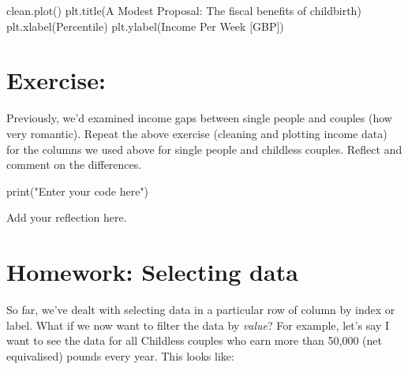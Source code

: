 \documentclass[
  letterpaper,
  DIV=11,
  numbers=noendperiod]{scrreprt}
\newenvironment{Shaded}{\begin{snugshade}}{\end{snugshade}}
\newcommand{\BuiltInTok}[1]{\textcolor[rgb]{0.00,0.23,0.31}{#1}}
\newcommand{\NormalTok}[1]{\textcolor[rgb]{0.00,0.23,0.31}{#1}}
\newcommand{\StringTok}[1]{\textcolor[rgb]{0.13,0.47,0.30}{#1}}
\begin{document}
\begin{Shaded}
\begin{Highlighting}[]
\NormalTok{clean.plot()}
\NormalTok{plt.title(}\StringTok{\textquotesingle{}A Modest Proposal: The fiscal benefits of childbirth\textquotesingle{}}\NormalTok{)}
\NormalTok{plt.xlabel(}\StringTok{\textquotesingle{}Percentile\textquotesingle{}}\NormalTok{)}
\NormalTok{plt.ylabel(}\StringTok{\textquotesingle{}Income Per Week [GBP]\textquotesingle{}}\NormalTok{)}
\end{Highlighting}
\end{Shaded}

\hypertarget{exercise-1}{%
\section{Exercise:}\label{exercise-1}}

Previously, we'd examined income gaps between single people and couples
(how very romantic). Repeat the above exercise (cleaning and plotting
income data) for the columns we used above for single people and
childless couples. Reflect and comment on the differences.

\begin{Shaded}
\begin{Highlighting}[]
\BuiltInTok{print}\NormalTok{(}\StringTok{"Enter your code here"}\NormalTok{)}
\end{Highlighting}
\end{Shaded}

\begin{Shaded}
\begin{Highlighting}[]
\NormalTok{Add your reflection here.}
\end{Highlighting}
\end{Shaded}

\hypertarget{homework-selecting-data}{%
\section{Homework: Selecting data}\label{homework-selecting-data}}

So far, we've dealt with selecting data in a particular row of column by
index or label. What if we now want to filter the data by \emph{value}?
For example, let's say I want to see the data for all Childless couples
who earn more than 50,000 (net equivalised) pounds every year. This
looks like:
\end{document}
